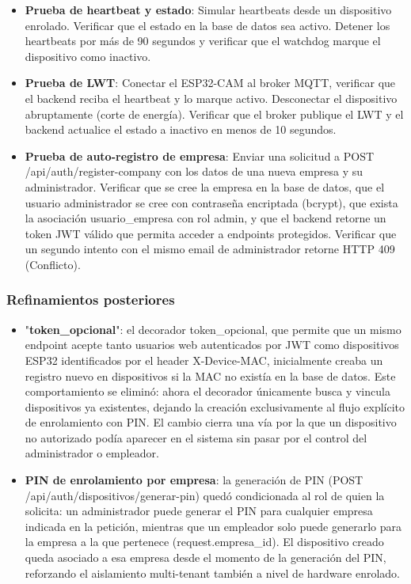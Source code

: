 \begin{itemize}
    \item \textbf{Prueba de heartbeat y estado}: Simular heartbeats desde un dispositivo enrolado. Verificar que el estado en la base de datos sea activo. Detener los heartbeats por más de 90 segundos y verificar que el watchdog marque el dispositivo como inactivo.

    \item \textbf{Prueba de LWT}: Conectar el ESP32-CAM al broker MQTT, verificar que el backend reciba el heartbeat y lo marque activo. Desconectar el dispositivo abruptamente (corte de energía). Verificar que el broker publique el LWT y el backend actualice el estado a inactivo en menos de 10 segundos.

    \item \textbf{Prueba de auto-registro de empresa}: Enviar una solicitud a POST /api/auth/register-company con los datos de una nueva empresa y su administrador. Verificar que se cree la empresa en la base de datos, que el usuario administrador se cree con contraseña encriptada (bcrypt), que exista la asociación usuario\_empresa con rol admin, y que el backend retorne un token JWT válido que permita acceder a endpoints protegidos. Verificar que un segundo intento con el mismo email de administrador retorne HTTP 409 (Conflicto).
\end{itemize}

\subsubsection{Refinamientos posteriores}

\begin{itemize}
    \item "\textbf{token\_opcional}": el decorador token\_opcional, que permite que un mismo endpoint acepte tanto usuarios web autenticados por JWT como dispositivos ESP32 identificados por el header X-Device-MAC, inicialmente creaba un registro nuevo en dispositivos si la MAC no existía en la base de datos. Este comportamiento se eliminó: ahora el decorador únicamente busca y vincula dispositivos ya existentes, dejando la creación exclusivamente al flujo explícito de enrolamiento con PIN. El cambio cierra una vía por la que un dispositivo no autorizado podía aparecer en el sistema sin pasar por el control del administrador o empleador.

    \item \textbf{PIN de enrolamiento por empresa}: la generación de PIN (POST /api/auth/dispositivos/generar-pin) quedó condicionada al rol de quien la solicita: un administrador puede generar el PIN para cualquier empresa indicada en la petición, mientras que un empleador solo puede generarlo para la empresa a la que pertenece (request.empresa\_id). El dispositivo creado queda asociado a esa empresa desde el momento de la generación del PIN, reforzando el aislamiento multi-tenant también a nivel de hardware enrolado.
\end{itemize}


